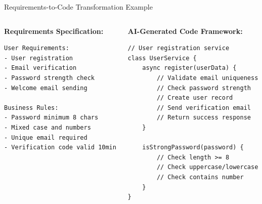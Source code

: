 \documentclass{beamer}
\begin{document}
\begin{frame}[t,fragile]{Requirements-to-Code Transformation Example}
    \begin{columns}
        \begin{column}{0.5\textwidth}
            \textbf{Requirements Specification:}
            \begin{lstlisting}[style=code]
User Requirements:
- User registration
- Email verification
- Password strength check
- Welcome email sending

Business Rules:
- Password minimum 8 chars
- Mixed case and numbers
- Unique email required
- Verification code valid 10min
            \end{lstlisting}
        \end{column}
        \begin{column}{0.5\textwidth}
            \textbf{AI-Generated Code Framework:}
            \begin{lstlisting}[style=code]
// User registration service
class UserService {
    async register(userData) {
        // Validate email uniqueness
        // Check password strength
        // Create user record
        // Send verification email
        // Return success response
    }
    
    isStrongPassword(password) {
        // Check length >= 8
        // Check uppercase/lowercase
        // Check contains number
    }
}
            \end{lstlisting}
        \end{column}
    \end{columns}
\end{frame}
\end{document}
